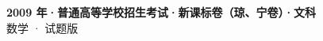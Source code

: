\documentclass[zihao=-4, a4paper]{ctexart}
\begin{document}
\begin{center}
  {\Large\bfseries 2009 年·普通高等学校招生考试·新课标卷（琼、宁卷）·文科}\\[4pt]
  {\large 数学 · 试题版}
\end{center}
\medskip
{}

\end{document}
